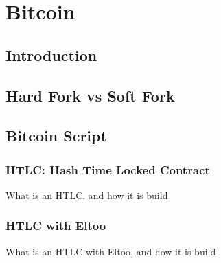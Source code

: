 \chapter{Bitcoin}

\section{Introduction}

\section{Hard Fork vs Soft Fork}
\label{sec:hard_vs_soft}

\section{Bitcoin Script}

\subsection{HTLC: Hash Time Locked Contract}
\label{sec:htlc_intro}
What is an HTLC, and how it is build

\subsection{HTLC with Eltoo}
What is an HTLC with Eltoo, and how it is build

